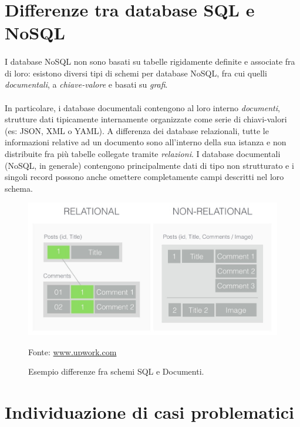\documentclass[a4paper, 12pt]{report}
\newcommand{\source}[1]{\caption*{Fonte: {#1}}}
\begin{document}
    \section{Differenze tra database SQL e NoSQL}
    \paragraph*{}
      I database NoSQL non sono basati su tabelle rigidamente definite e associate fra di loro: esistono diversi tipi di schemi per database NoSQL, fra cui quelli \emph{documentali}, a \emph{chiave-valore} e basati su \emph{grafi}.
      \paragraph*{}
      In particolare, i database documentali contengono al loro interno \emph{documenti}, strutture dati tipicamente internamente organizzate come serie di chiavi-valori (es: JSON, XML o YAML).
      A differenza dei database relazionali, tutte le informazioni relative ad un documento sono all'interno della sua istanza e non distribuite fra più tabelle collegate tramite \emph{relazioni}.
      I database documentali (NoSQL, in generale) contengono principalmente dati di tipo non strutturato e i singoli record possono anche omettere completamente campi descritti nel loro schema.
      \begin{figure}[H]
        \includegraphics[width=\textwidth]{relational-documental.jpg}
        \caption{Esempio differenze fra schemi SQL e Documenti.}
        \source{\href{https://www.upwork.com/resources/sql-vs-nosql-databases-whats-the-difference/}{www.upwork.com}}
      \end{figure}
    \section{Individuazione di casi problematici}
\end{document}
